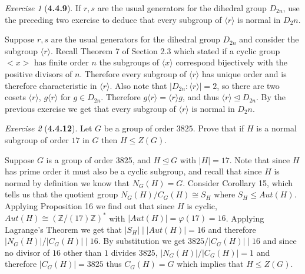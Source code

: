 \documentclass[12pt]{amsart}
\makeatletter
\theoremstyle{remark}
\newtheorem*{exercise}{Exercise}%
\def\ZZ{\ensuremath{\mathbb Z}}
\renewenvironment{proof}[1][\proofname]{\par\doublespacing
  \pushQED{\qed}%
  \normalfont \topsep6\p@\@plus6\p@\relax
  \list{}{%
    \settowidth{\leftmargin}{\itshape\proofname:\hskip\labelsep}%
    \setlength{\labelwidth}{0pt}%
    \setlength{\itemindent}{-\leftmargin}%
  }%
  \item[\hskip\labelsep\itshape#1\@addpunct{:}]\ignorespaces
}{%
  \popQED\endlist\@endpefalse
  \singlespacing
}
\theoremstyle{mycomment}
\makeatother
\begin{document}
\begin{exercise}[\textbf{4.4.9}] If $r, s$ are the usual generators for the dihedral group $D_{2n}$, use the preceding 
  two exercise to deduce that every subgroup of $\langle r \rangle$ is normal in $D_2n$. 
  \begin{proof}  Suppose $r, s$ are the usual generators for the dihedral group $D_{2n}$ and consider the subgroup $\langle r \rangle$. 
    Recall Theorem 7 of Section 2.3 which stated if a cyclic group $<x>$ has finite order $n$ the subgroups of $\langle x \rangle$ correspond bijectively with the positive divisors of $n$.
    Therefore every subgroup of $\langle r \rangle$ has unique order and is therefore characteristic in $\langle r\rangle$. Also note that 
    $|D_{2n}:\langle r \rangle | = 2$, so there are two cosets $\langle r\rangle$, $g\langle r \rangle$ for $g \in D_{2n}$. 
    Therefore $g\langle r\rangle = \langle r \rangle g$, and thus $\langle r \rangle \trianglelefteq D_{2n}$. By the previous exercise we 
    get that every subgroup of $\langle r \rangle$ is normal in $D_2n$. 
    \end{proof}
\end{exercise}
\vspace{.15in}


\begin{exercise}[\textbf{4.4.12}]Let $G$ be a group of order $3825$. Prove that if $H$ is a normal subgroup 
  of order $17$ in $G$ then $H \leq Z(G)$. 
  \begin{proof} Suppose $G$ is a group of order 3825, and $H \trianglelefteq G$ with $|H| = 17$. Note that 
    since $H$ has prime order it must also be a cyclic subgroup, and recall that since $H$ is normal by definition 
    we know that $N_G(H) = G$. Consider Corollary 15, which tells us that the quotient group $N_G(H)/C_G(H) \cong S_H$ where 
    $S_H \leq Aut(H)$. Applying Proposition 16 we find out that since $H$ is cyclic, $Aut(H) \cong (\ZZ/(17)\ZZ)^*$ with 
    $|Aut(H)| = \varphi(17) = 16$. Applying Lagrange's Theorem we get that $|S_H| \mid |Aut(H)| = 16$ and therefore 
    $|N_G(H)|/|C_G(H)| \mid 16$. By substitution we get $3825/|C_G(H)| \mid 16$ and since no divisor of $16$ other than $1$ divides $3825$,
     $|N_G(H)|/|C_G(H)| = 1$ and therefore $|C_G(H)| = 3825$ thus $C_G(H) = G$ which implies that $H \leq Z(G)$.

    \end{proof}
\end{exercise}
\vspace{.15in}
\end{document}
